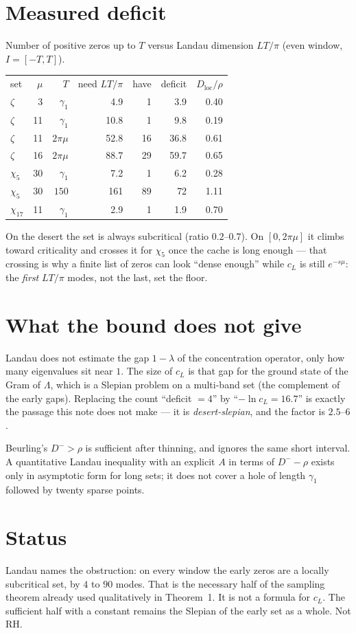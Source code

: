 \documentclass[11pt]{article}
\begin{document}
\section{Measured deficit}
Number of positive zeros up to $T$ versus Landau dimension
$LT/\pi$ (even window, $I=[-T,T]$).

\begin{center}
\small
\begin{tabular}{lrrrrrr}
set & $\mu$ & $T$ & need $LT/\pi$ & have & deficit & $D_{\mathrm{loc}}/\rho$\\
$\zeta$ & 3 & $\gamma_1$ & 4.9 & 1 & 3.9 & 0.40\\
$\zeta$ & 11 & $\gamma_1$ & 10.8 & 1 & 9.8 & 0.19\\
$\zeta$ & 11 & $2\pi\mu$ & 52.8 & 16 & 36.8 & 0.61\\
$\zeta$ & 16 & $2\pi\mu$ & 88.7 & 29 & 59.7 & 0.65\\
$\chi_5$ & 30 & $\gamma_1$ & 7.2 & 1 & 6.2 & 0.28\\
$\chi_5$ & 30 & $150$ & 161 & 89 & 72 & 1.11\\
$\chi_{17}$ & 11 & $\gamma_1$ & 2.9 & 1 & 1.9 & 0.70\\
\end{tabular}
\end{center}

On the desert the set is always subcritical (ratio $0.2$--$0.7$).
On $[0,2\pi\mu]$ it climbs toward criticality and crosses it for
$\chi_5$ once the cache is long enough --- that crossing is why a
finite list of zeros can look ``dense enough'' while $c_L$ is
still $e^{-s\mu}$: the \emph{first} $LT/\pi$ modes, not the last,
set the floor.

\section{What the bound does not give}
Landau does not estimate the gap $1-\lambda$ of the concentration
operator, only how many eigenvalues sit near $1$. The size of
$c_L$ is that gap for the ground state of the Gram of $\Lambda$,
which is a Slepian problem on a multi-band set (the complement of
the early gaps). Replacing the count ``deficit $=4$'' by
``$-\ln c_L=16.7$'' is exactly the passage this note does not
make --- it is \emph{desert-slepian}, and the factor is $2.5$--$6$.

Beurling's $D^->\rho$ is sufficient after thinning, and ignores
the same short interval. A quantitative Landau inequality with an
explicit $A$ in terms of $D^--\rho$ exists only in asymptotic
form for long sets; it does not cover a hole of length $\gamma_1$
followed by twenty sparse points.

\section*{Status}
Landau names the obstruction: on every window the early zeros are
a locally subcritical set, by $4$ to $90$ modes. That is the
necessary half of the sampling theorem already used qualitatively
in Theorem~1. It is not a formula for $c_L$. The sufficient
half with a constant remains the Slepian of the early set as a
whole. Not RH.
\end{document}
